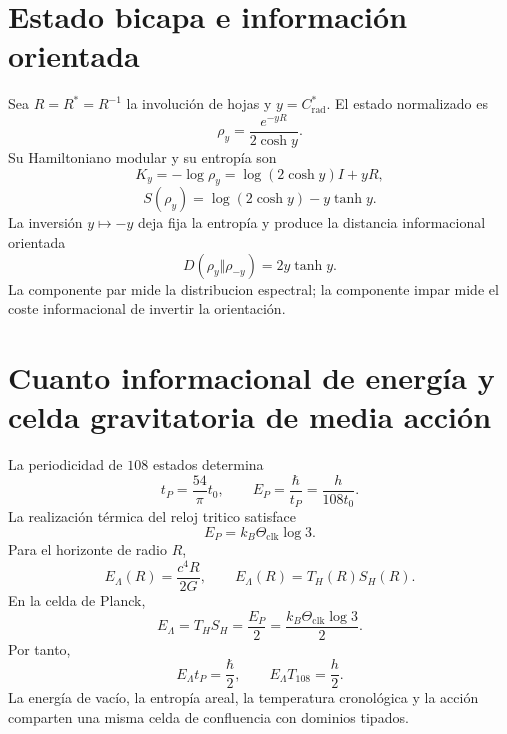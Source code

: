 \section{Estado bicapa e información orientada}
\label{sec:l9s102:estado-bicapa}

Sea \(R=R^*=R^{-1}\) la involución de hojas y
\(y=C^*_{\mathrm{rad}}\). El estado normalizado es
\begin{equation}
 \boxed{
 \rho_y=\frac{e^{-yR}}{2\cosh y}.}
 \label{eq:l9s102:rho-y}
\end{equation}
Su Hamiltoniano modular y su entropía son
\begin{equation}
 K_y=-\log\rho_y=\log(2\cosh y)I+yR,
 \label{eq:l9s102:ky}
\end{equation}
\begin{equation}
 S(\rho_y)=\log(2\cosh y)-y\tanh y.
 \label{eq:l9s102:entropia-y}
\end{equation}
La inversión \(y\mapsto-y\) deja fija la entropía y produce la distancia
informacional orientada
\begin{equation}
 \boxed{
 D(\rho_y\Vert\rho_{-y})=2y\tanh y.}
 \label{eq:l9s102:entropia-relativa-hojas}
\end{equation}
La componente par mide la distribucion espectral; la componente impar mide
el coste informacional de invertir la orientación.

\section{Cuanto informacional de energía y celda gravitatoria de media acción}
\label{sec:l9s102:horizonte-media-accion}

La periodicidad de \(108\) estados determina
\begin{equation}
 t_P=\frac{54}{\pi}t_0,
 \qquad
 E_P=\frac{\hbar}{t_P}=\frac{h}{108t_0}.
 \label{eq:l9s102:ep-tp}
\end{equation}
La realización térmica del reloj tritico satisface
\begin{equation}
 \boxed{
 E_P=k_B\Theta_{\mathrm{clk}}\log3.}
 \label{eq:l9s102:planck-trit}
\end{equation}
Para el horizonte de radio \(R\),
\begin{equation}
 E_\Lambda(R)=\frac{c^4R}{2G},
 \qquad
 E_\Lambda(R)=T_H(R)S_H(R).
 \label{eq:l9s102:energia-horizonte}
\end{equation}
En la celda de Planck,
\begin{equation}
 \boxed{
 E_\Lambda
 =T_HS_H
 =\frac{E_P}{2}
 =\frac{k_B\Theta_{\mathrm{clk}}\log3}{2}.}
 \label{eq:l9s102:confluencia-horizonte}
\end{equation}
Por tanto,
\begin{equation}
 \boxed{
 E_\Lambda t_P=\frac{\hbar}{2},
 \qquad
 E_\Lambda T_{108}=\frac h2.}
 \label{eq:l9s102:media-accion}
\end{equation}
La energía de vacío, la entropía areal, la temperatura cronológica y la
acción comparten una misma celda de confluencia con dominios tipados.

